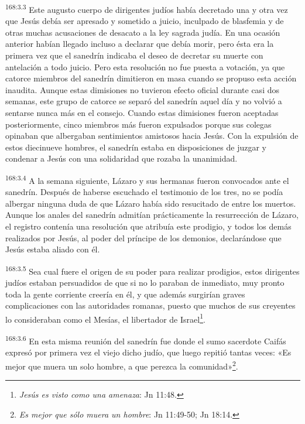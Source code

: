 \par
\textsuperscript{168:3.3} Este augusto cuerpo de dirigentes judíos había decretado una y otra vez que Jesús debía ser apresado y sometido a juicio, inculpado de blasfemia y de otras muchas acusaciones de desacato a la ley sagrada judía. En una ocasión anterior habían llegado incluso a declarar que debía morir, pero ésta era la primera vez que el sanedrín indicaba el deseo de decretar su muerte con antelación a todo juicio. Pero esta resolución no fue puesta a votación, ya que catorce miembros del sanedrín dimitieron en masa cuando se propuso esta acción inaudita. Aunque estas dimisiones no tuvieron efecto oficial durante casi dos semanas, este grupo de catorce se separó del sanedrín aquel día y no volvió a sentarse nunca más en el consejo. Cuando estas dimisiones fueron aceptadas posteriormente, cinco miembros más fueron expulsados porque sus colegas opinaban que albergaban sentimientos amistosos hacia Jesús. Con la expulsión de estos diecinueve hombres, el sanedrín estaba en disposiciones de juzgar y condenar a Jesús con una solidaridad que rozaba la unanimidad.

\par
\textsuperscript{168:3.4} A la semana siguiente, Lázaro y sus hermanas fueron convocados ante el sanedrín. Después de haberse escuchado el testimonio de los tres, no se podía albergar ninguna duda de que Lázaro había sido resucitado de entre los muertos. Aunque los anales del sanedrín admitían prácticamente la resurrección de Lázaro, el registro contenía una resolución que atribuía este prodigio, y todos los demás realizados por Jesús, al poder del príncipe de los demonios, declarándose que Jesús estaba aliado con él.

\par
\textsuperscript{168:3.5} Sea cual fuere el origen de su poder para realizar prodigios, estos dirigentes judíos estaban persuadidos de que si no lo paraban de inmediato, muy pronto toda la gente corriente creería en él, y que además surgirían graves complicaciones con las autoridades romanas, puesto que muchos de sus creyentes lo consideraban como el Mesías, el libertador de Israel\footnote{\textit{Jesús es visto como una amenaza}: Jn 11:48.}.

\par
\textsuperscript{168:3.6} En esta misma reunión del sanedrín fue donde el sumo sacerdote Caifás expresó por primera vez el viejo dicho judío, que luego repitió tantas veces: «Es mejor que muera un solo hombre, a que perezca la comunidad»\footnote{\textit{Es mejor que sólo muera un hombre}: Jn 11:49-50; Jn 18:14.}.

